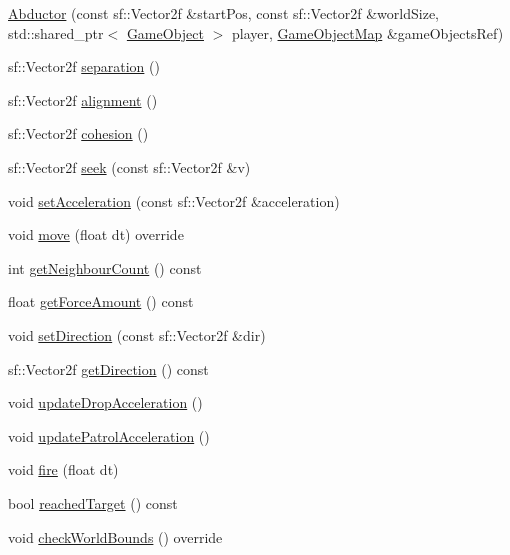 \begin{DoxyCompactItemize}
\item 
\hyperlink{class_abductor_ac68525ef8d05680afbef24761e2baa8c}{Abductor} (const sf\+::\+Vector2f \&start\+Pos, const sf\+::\+Vector2f \&world\+Size, std\+::shared\+\_\+ptr$<$ \hyperlink{class_game_object}{Game\+Object} $>$ player, \hyperlink{class_abductor_a15ce0d62a23ac0c3e335874ff4286f5f}{Game\+Object\+Map} \&game\+Objects\+Ref)
\item 
sf\+::\+Vector2f \hyperlink{class_abductor_aac2bef46d63d3aa630a34ee1cb23a7f6}{separation} ()
\item 
sf\+::\+Vector2f \hyperlink{class_abductor_ac8ef27110672980a395fa9ba68299337}{alignment} ()
\item 
sf\+::\+Vector2f \hyperlink{class_abductor_ad1660967efd5c4abcdee49989a966722}{cohesion} ()
\item 
sf\+::\+Vector2f \hyperlink{class_abductor_a2c5431c2d7afa37f9f083762eff5a995}{seek} (const sf\+::\+Vector2f \&v)
\item 
void \hyperlink{class_abductor_a7147793ce13d446f83eb52920dfa15f7}{set\+Acceleration} (const sf\+::\+Vector2f \&acceleration)
\item 
void \hyperlink{class_abductor_a10bb137ba1b1707466f0a893052a0b30}{move} (float dt) override
\item 
int \hyperlink{class_abductor_ae8c4cc87315ccc822d59d73a7c12c94a}{get\+Neighbour\+Count} () const
\item 
float \hyperlink{class_abductor_a8bc04ea46a52e8a58feceee69a8965d0}{get\+Force\+Amount} () const
\item 
void \hyperlink{class_abductor_aad7a615477ffe510984c8df16e98c903}{set\+Direction} (const sf\+::\+Vector2f \&dir)
\item 
sf\+::\+Vector2f \hyperlink{class_abductor_a30a40083cd604343d7b1d63e1a48a3fa}{get\+Direction} () const
\item 
void \hyperlink{class_abductor_aab823ab3fd94214f90b003661e036d03}{update\+Drop\+Acceleration} ()
\item 
void \hyperlink{class_abductor_a24cc63afd005eef7d1ed694933a2c2a0}{update\+Patrol\+Acceleration} ()
\item 
void \hyperlink{class_abductor_a12b84d9d38bec8ed3b495c5657903e50}{fire} (float dt)
\item 
bool \hyperlink{class_abductor_acc2841707aaeb5719ecc615b5fe6bf56}{reached\+Target} () const
\item 
void \hyperlink{class_abductor_a4b86fdcd63a060c53da22f092a113b24}{check\+World\+Bounds} () override

\end{DoxyCompactItemize}
